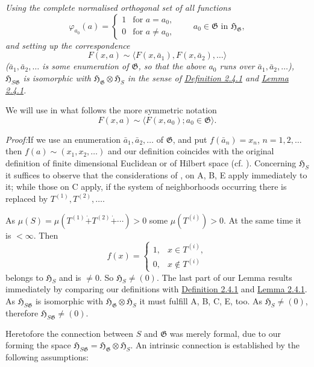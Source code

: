 \documentclass[12pt,b5paper,twoside]{article}
\newcommand{\Hspace}{\mathfrak H}
\newcommand{\Proof}{\par\noindent\textit{Proof:}\enspace}
\newcommand{\defref}[1]{\hyperref[def:#1]{Definition #1}}
\newcommand{\lemref}[1]{\hyperref[lem:#1]{Lemma #1}}
\begin{document}
\emph{Using the complete normalised orthogonal set of all functions}
\[
 \varphi_{a_0}(a)=
 \begin{cases}
  1&\text{for }a=a_0,\\
  0&\text{for }a\neq a_0,
 \end{cases}
 \qquad a_0\in\mathfrak G\text{ in }\Hspace_{\mathfrak G},
\]
\emph{and setting up the correspondence}
\[
 F(x,a)\sim\langle F(x,\bar a_1),F(x,\bar a_2),\ldots\rangle
\]
\emph{($\bar a_1,\bar a_2,\ldots$ is some enumeration of $\mathfrak G$, so
that the above $a_0$ runs over $\bar a_1,\bar a_2,\ldots$),
$\Hspace_{S\mathfrak G}$ is isomorphic with
$\Hspace_{\mathfrak G}\otimes\Hspace_S$ in the sense of
\defref{2.4.1} and \lemref{2.4.1}.}

We will use in what follows the more symmetric notation
\[
 F(x,a)\sim\langle F(x,a_0);a_0\in\mathfrak G\rangle.
\]

\Proof If we use an enumeration $\bar a_1,\bar a_2,\ldots$ of $\mathfrak G$,
and put $f(\bar a_n)=x_n$, $n=1,2,\ldots$ then
$f(a)\sim(x_1,x_2,\ldots)$ and our definition coincides with the original
definition of finite dimensional Euclidean or of Hilbert space
(cf. \cite[p.~69]{ref16}). Concerning $\Hspace_S$ it suffices to observe that
the considerations of \cite[pp.~108--111]{ref16}, on A, B, E apply immediately
to it; while those on C apply, if the system of neighborhoods occurring there
is replaced by $T^{(1)},T^{(2)},\ldots$.

As
$\mu(S)=\mu(T^{(1)}\mathbin{\dot+}T^{(2)}\mathbin{\dot+}\cdots)>0$ some
$\mu(T^{(i)})>0$. At the same time it is $<\infty$. Then
\[
 f(x)=\begin{cases}
  1,&x\in T^{(i)},\\
  0,&x\notin T^{(i)}
 \end{cases}
\]
belongs to $\Hspace_S$ and is $\neq0$. So $\Hspace_S\neq(0)$. The last part
of our Lemma results immediately by comparing our definitions with
\defref{2.4.1} and \lemref{2.4.1}. As $\Hspace_{S\mathfrak G}$ is isomorphic
with $\Hspace_{\mathfrak G}\otimes\Hspace_S$ it must fulfill A, B, C, E, too.
As $\Hspace_S\neq(0)$, therefore $\Hspace_{S\mathfrak G}\neq(0)$.

Heretofore the connection between $S$ and $\mathfrak G$ was merely formal,
due to our forming the space
$\Hspace_{S\mathfrak G}=\Hspace_{\mathfrak G}\otimes\Hspace_S$. An intrinsic
connection is established by the following assumptions:
\end{document}
